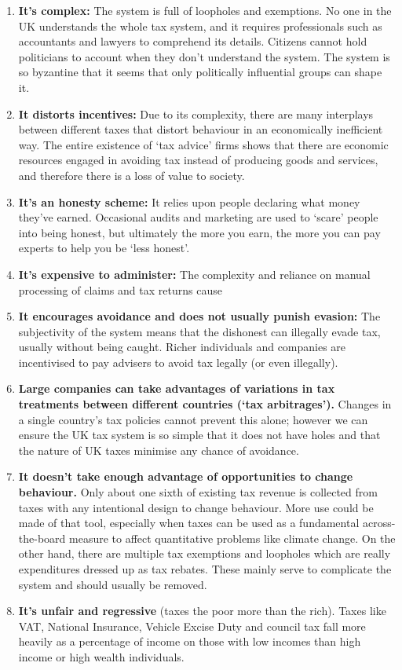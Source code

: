\documentclass[]{tufte-handout}
\providecommand{\tightlist}{%
  \setlength{\itemsep}{0pt}\setlength{\parskip}{0pt}}
\begin{document}
\begin{enumerate}
\def\labelenumi{\arabic{enumi}.}
\tightlist
\item
  \textbf{It's complex:} The system is full of loopholes and exemptions.
  No one in the UK understands the whole tax system, and it requires
  professionals such as accountants and lawyers to comprehend its
  details. Citizens cannot hold politicians to account when they don't
  understand the system. The system is so byzantine that it seems that
  only politically influential groups can shape it.
\item
  \textbf{It distorts incentives:} Due to its complexity, there are many
  interplays between different taxes that distort behaviour in an
  economically inefficient way. The entire existence of `tax advice'
  firms shows that there are economic resources engaged in avoiding tax
  instead of producing goods and services, and therefore there is a loss
  of value to society.
\item
  \textbf{It's an honesty scheme:} It relies upon people declaring what
  money they've earned. Occasional audits and marketing are used to
  `scare' people into being honest, but ultimately the more you earn,
  the more you can pay experts to help you be `less honest'.
\item
  \textbf{It's expensive to administer:} The complexity and reliance on
  manual processing of claims and tax returns cause
\item
  \textbf{It encourages avoidance and does not usually punish evasion:}
  The subjectivity of the system means that the dishonest can illegally
  evade tax, usually without being caught. Richer individuals and
  companies are incentivised to pay advisers to avoid tax legally (or
  even illegally).
\item
  \textbf{Large companies can take advantages of variations in tax
  treatments between different countries (`tax arbitrages').} Changes in
  a single country's tax policies cannot prevent this alone; however we
  can ensure the UK tax system is so simple that it does not have holes
  and that the nature of UK taxes minimise any chance of avoidance.
\item
  \textbf{It doesn't take enough advantage of opportunities to change
  behaviour.} Only about one sixth of existing tax revenue is collected
  from taxes with any intentional design to change behaviour. More use
  could be made of that tool, especially when taxes can be used as a
  fundamental across-the-board measure to affect quantitative problems
  like climate change. On the other hand, there are multiple tax
  exemptions and loopholes which are really expenditures dressed up as
  tax rebates. These mainly serve to complicate the system and should
  usually be removed.
\item
  \textbf{It's unfair and regressive} (taxes the poor more than the
  rich). Taxes like VAT, National Insurance, Vehicle Excise Duty and
  council tax fall more heavily as a percentage of income on those with
  low incomes than high income or high wealth individuals.
\end{enumerate}
\end{document}
